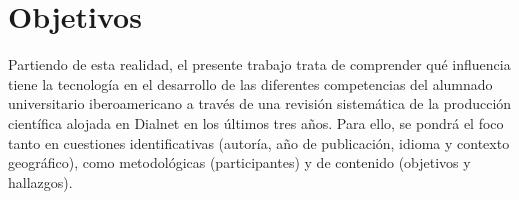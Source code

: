 \section{Objetivos}\label{sec-objetivos}


Partiendo de esta realidad, el presente trabajo trata de comprender qué
influencia tiene la tecnología en el desarrollo de las diferentes
competencias del alumnado universitario iberoamericano a través de una
revisión sistemática de la producción científica alojada en Dialnet en
los últimos tres años. Para ello, se pondrá el foco tanto en cuestiones
identificativas (autoría, año de publicación, idioma y contexto
geográfico), como metodológicas (participantes) y de contenido
(objetivos y hallazgos).
